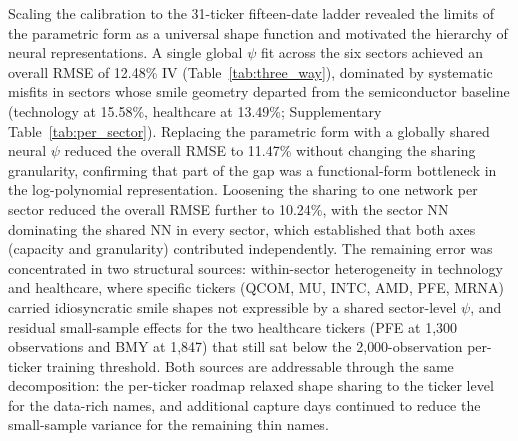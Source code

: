 Scaling the calibration to the 31-ticker fifteen-date ladder revealed the limits of the parametric form as a universal shape function and motivated the hierarchy of neural representations. A single global $\psi$ fit across the six sectors achieved an overall RMSE of 12.48\% IV (Table~\ref{tab:three_way}), dominated by systematic misfits in sectors whose smile geometry departed from the semiconductor baseline (technology at 15.58\%, healthcare at 13.49\%; Supplementary Table~\ref{tab:per_sector}). Replacing the parametric form with a globally shared neural $\psi$ reduced the overall RMSE to 11.47\% without changing the sharing granularity, confirming that part of the gap was a functional-form bottleneck in the log-polynomial representation. Loosening the sharing to one network per sector reduced the overall RMSE further to 10.24\%, with the sector NN dominating the shared NN in every sector, which established that both axes (capacity and granularity) contributed independently. The remaining error was concentrated in two structural sources: within-sector heterogeneity in technology and healthcare, where specific tickers (QCOM, MU, INTC, AMD, PFE, MRNA) carried idiosyncratic smile shapes not expressible by a shared sector-level $\psi$, and residual small-sample effects for the two healthcare tickers (PFE at 1{,}300 observations and BMY at 1{,}847) that still sat below the 2{,}000-observation per-ticker training threshold. Both sources are addressable through the same decomposition: the per-ticker roadmap relaxed shape sharing to the ticker level for the data-rich names, and additional capture days continued to reduce the small-sample variance for the remaining thin names.

